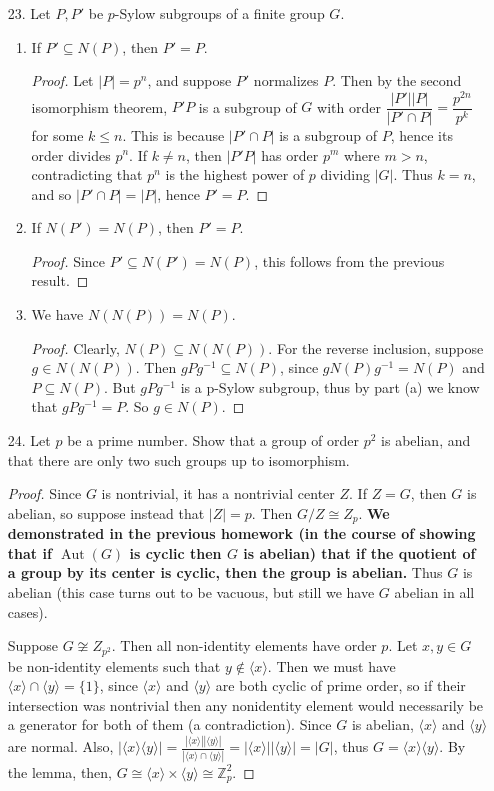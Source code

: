 \documentclass[10pt]{article}
\newcommand{\Z}{\mathbb{Z}}
\newcommand{\gen}[1]{\langle #1 \rangle}
\DeclareMathOperator*{\Aut}{Aut}
\begin{document}
\begin{enumerate}
\item[23.] Let $P, P'$ be $p$-Sylow subgroups of a finite group $G$.
\begin{enumerate}
\item If $P' \subseteq N(P)$, then $P' = P$.
\begin{proof}
Let $|P| = p^n$, and suppose $P'$ normalizes $P$.  Then by the second isomorphism theorem, $P'P$ is a subgroup of $G$ with order $\dfrac{|P'||P|}{|P' \cap P|} = \dfrac{p^{2n}}{p^k}$ for some $k \leq n$.  This is because $|P' \cap P|$ is a subgroup of $P$, hence its order divides $p^n$.  If $k \neq n$, then $|P'P|$ has order $p^m$ where $m > n$, contradicting that $p^n$ is the highest power of $p$ dividing $|G|$.  Thus $k = n$, and so $|P' \cap P| = |P|$, hence $P' = P$.
\end{proof}
\item If $N(P') = N(P)$, then $P' = P$.
\begin{proof}
Since $P' \subseteq N(P') = N(P)$, this follows from the previous result.
\end{proof}
\item We have $N(N(P)) = N(P)$.
\begin{proof}
Clearly, $N(P) \subseteq N(N(P))$.  For the reverse inclusion, suppose $g \in N(N(P))$.  Then $gPg^{-1} \subseteq N(P)$, since $gN(P)g^{-1} = N(P)$ and $P \subseteq N(P)$.  But $gPg^{-1}$ is a p-Sylow subgroup, thus by part (a) we know that $gPg^{-1} = P$.  So $g \in N(P)$.
\end{proof}
\end{enumerate}

\item[24.] Let $p$ be a prime number.  Show that a group of order $p^2$ is abelian, and that there are only two such groups up to isomorphism.

\begin{proof}
Since $G$ is nontrivial, it has a nontrivial center $Z$.  If $Z = G$, then $G$ is abelian, so suppose instead that $|Z| = p$.  Then $G / Z \cong Z_p$.  \textbf{We demonstrated in the previous homework (in the course of showing that if $\Aut(G)$ is cyclic then $G$ is abelian) that if the quotient of a group by its center is cyclic, then the group is abelian.}  Thus $G$ is abelian (this case turns out to be vacuous, but still we have $G$ abelian in all cases).

Suppose $G \not \cong Z_{p^2}$.  Then all non-identity elements have order $p$.  Let $x,y \in G$ be non-identity elements such that $y \not \in \gen{x}$.  Then we must have $\gen{x} \cap \gen{y} = \{1\}$, since $\gen{x}$ and $\gen{y}$ are both cyclic of prime order, so if their intersection was nontrivial then any nonidentity element would necessarily be a generator for both of them (a contradiction).  Since $G$ is abelian, $\gen{x}$ and $\gen{y}$ are normal.  Also, $|\gen{x}\gen{y}| = \frac{|\gen{x}||\gen{y}|}{|\gen{x} \cap \gen{y}|} = |\gen{x}||\gen{y}| = |G|$, thus $G = \gen{x}\gen{y}$.  By the lemma, then, $G \cong \gen{x} \times \gen{y} \cong \Z_p^2$.


\end{proof}
\end{enumerate}
\end{document}
